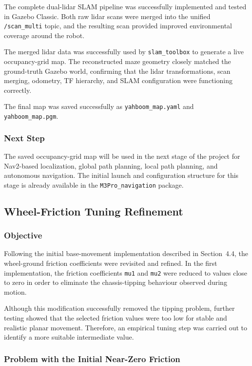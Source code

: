\documentclass{article}
\begin{document}
The complete dual-lidar SLAM pipeline was successfully implemented and tested in Gazebo Classic. Both raw lidar scans were merged into the unified \texttt{/scan\_multi} topic, and the resulting scan provided improved environmental coverage around the robot.

The merged lidar data was successfully used by \texttt{slam\_toolbox} to generate a live occupancy-grid map. The reconstructed maze geometry closely matched the ground-truth Gazebo world, confirming that the lidar transformations, scan merging, odometry, TF hierarchy, and SLAM configuration were functioning correctly.

The final map was saved successfully as \texttt{yahboom\_map.yaml} and \texttt{yahboom\_map.pgm}.

\subsubsection{Next Step}

The saved occupancy-grid map will be used in the next stage of the project for Nav2-based localization, global path planning, local path planning, and autonomous navigation. The initial launch and configuration structure for this stage is already available in the \texttt{M3Pro\_navigation} package.


\subsection{Wheel-Friction Tuning Refinement}
\label{sec:wheel_friction_refinement}

\subsubsection{Objective}

Following the initial base-movement implementation described in Section~4.4, the wheel-ground friction coefficients were revisited and refined. In the first implementation, the friction coefficients \texttt{mu1} and \texttt{mu2} were reduced to values close to zero in order to eliminate the chassis-tipping behaviour observed during motion.

Although this modification successfully removed the tipping problem, further testing showed that the selected friction values were too low for stable and realistic planar movement. Therefore, an empirical tuning step was carried out to identify a more suitable intermediate value.

\subsubsection{Problem with the Initial Near-Zero Friction}
\end{document}
